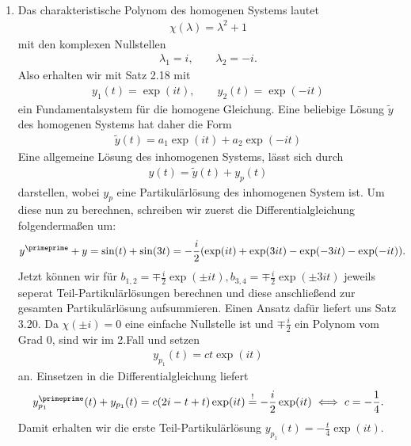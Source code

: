 \begin{solution}
\leavevmode \\
\begin{enumerate}[label = \textbf{\alph*)}]
  \item Das charakteristische Polynom des homogenen Systems lautet
  \begin{align*}
    \chi(\lambda) = \lambda^2 + 1
  \end{align*}
  mit den komplexen Nullstellen
  \begin{align*}
    \lambda_1 = i, \qquad \lambda_2 = -i.
  \end{align*}
  Also erhalten wir mit Satz 2.18 mit
  \begin{align*}
    y_1(t) = \exp(it), \qquad y_2(t) = \exp(-it)
  \end{align*}
  ein Fundamentalsystem für die homogene Gleichung.
  Eine beliebige Lösung $\widetilde{y}$ des homogenen Systems hat daher die Form
  \begin{align*}
    \widetilde{y}(t) = a_1\exp(it) + a_2\exp(-it)
  \end{align*}
  Eine allgemeine Lösung des inhomogenen Systems, lässt sich durch
  \begin{align*}
    y(t) = \widetilde{y}(t) + y_p(t)
  \end{align*}
  darstellen, wobei $y_p$ eine Partikulärlösung des inhomogenen System ist.
  Um diese nun zu berechnen, schreiben wir zuerst die Differentialgleichung folgendermaßen um:
  \begin{align*}
    y^{\primeprime} + y &= \sin(t) + \sin(3t)
    = -\frac{i}{2}(\exp(it) + \exp(3it) - \exp(-3it) - \exp(-it)).
  \end{align*}
  Jetzt können wir für $b_{1,2} = \mp\frac{i}{2}\exp(\pm it), b_{3,4} = \mp\frac{i}{2}\exp(\pm 3it)$
  jeweils seperat Teil-Partikulärlösungen berechnen und diese anschließend zur gesamten Partikulärlösung
  aufsummieren. Einen Ansatz dafür liefert uns Satz 3.20. Da $\chi(\pm i) = 0$ eine
  einfache Nullstelle ist und $\mp\frac{i}{2}$ ein Polynom vom Grad $0$,
  sind wir im 2.Fall und setzen
  \begin{align*}
    y_{p_1}(t) = ct\exp(it)
  \end{align*}
  an. Einsetzen in die Differentialgleichung liefert
  \begin{align*}
    y_{p_1}^{\primeprime}(t) + y_{p_1}(t) = c(2i - t + t)\exp(it)\stackrel{!}{=}
    -\frac{i}{2}\exp(it) \iff c = -\frac{1}{4}.
  \end{align*}
  Damit erhalten wir die erste Teil-Partikulärlösung $y_{p_1}(t) = -\frac{t}{4}\exp(it)$. \\

\end{enumerate}
\end{solution}
